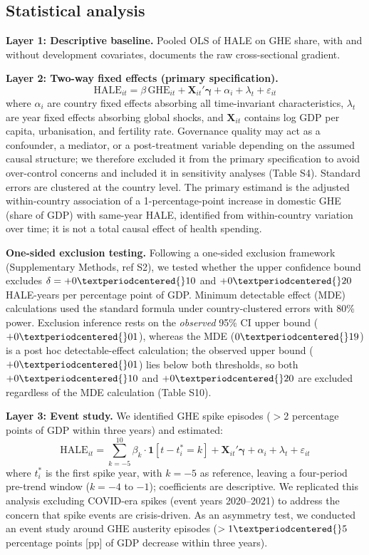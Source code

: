 \documentclass[12pt,a4paper]{article}
\begin{document}
\subsection*{Statistical analysis}


\textbf{Layer 1: Descriptive baseline.} Pooled OLS of HALE on GHE share, with and without development covariates, documents the raw cross-sectional gradient.

\textbf{Layer 2: Two-way fixed effects (primary specification).}
\begin{equation}
\text{HALE}_{it} = \beta\,\text{GHE}_{it} + \mathbf{X}_{it}'\boldsymbol{\gamma}
+ \alpha_i + \lambda_t + \varepsilon_{it}
\end{equation}
where $\alpha_i$ are country fixed effects absorbing all time-invariant
characteristics, $\lambda_t$ are year fixed effects absorbing global shocks,
and $\mathbf{X}_{it}$ contains log GDP per capita, urbanisation, and fertility
rate. Governance quality may act as a confounder, a mediator, or a
post-treatment variable depending on the assumed causal structure; we
therefore excluded it from the primary specification to avoid over-control
concerns and included it in sensitivity analyses (Table S4). Standard errors are clustered at the country
level. The primary estimand is the adjusted within-country association of a
1-percentage-point increase in domestic GHE (share of GDP) with same-year
HALE, identified from within-country variation over time; it is not a total
causal effect of health spending.

\textbf{One-sided exclusion testing.} Following a one-sided exclusion framework (Supplementary Methods, ref S2), we tested whether the upper confidence bound excludes $\delta = +0{\textperiodcentered{}}10$ and $+0{\textperiodcentered{}}20$ HALE-years per percentage point of GDP. Minimum detectable effect (MDE) calculations used the standard formula under country-clustered errors with 80\% power. Exclusion inference rests on the \textit{observed} 95\% CI upper bound ($+0{\textperiodcentered{}}01$), whereas the MDE ($0{\textperiodcentered{}}19$) is a post hoc detectable-effect calculation; the observed upper bound ($+0{\textperiodcentered{}}01$) lies below both thresholds, so both $+0{\textperiodcentered{}}10$ and $+0{\textperiodcentered{}}20$ are excluded regardless of the MDE calculation (Table S10).

\textbf{Layer 3: Event study.} We identified GHE spike episodes ($>$2 percentage
points of GDP within three years) and estimated:
\begin{equation}
\text{HALE}_{it} = \sum_{k=-5}^{10} \beta_k \cdot \mathbf{1}[t - t_i^* = k]
+ \mathbf{X}_{it}'\boldsymbol{\gamma} + \alpha_i + \lambda_t + \varepsilon_{it}
\end{equation}
where $t_i^*$ is the first spike year, with $k = -5$ as reference, leaving a four-period pre-trend window ($k = -4$ to $-1$); coefficients are descriptive. We replicated this analysis excluding COVID-era spikes (event years
2020--2021) to address the concern that spike events are crisis-driven. As an
asymmetry test, we conducted an event study around GHE austerity episodes
($>1{\textperiodcentered{}}5$ percentage points [pp] of GDP decrease within three years).
\end{document}
